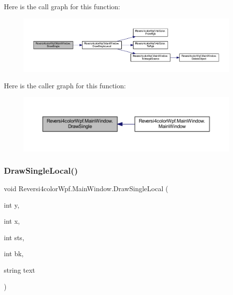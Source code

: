 Here is the call graph for this function\+:
\nopagebreak
\begin{figure}[H]
\begin{center}
\leavevmode
\includegraphics[width=350pt]{class_reversi4color_wpf_1_1_main_window_a423004ac78eb7b105b4cbd4d80a56f15_cgraph}
\end{center}
\end{figure}
Here is the caller graph for this function\+:
\nopagebreak
\begin{figure}[H]
\begin{center}
\leavevmode
\includegraphics[width=350pt]{class_reversi4color_wpf_1_1_main_window_a423004ac78eb7b105b4cbd4d80a56f15_icgraph}
\end{center}
\end{figure}
\mbox{\label{class_reversi4color_wpf_1_1_main_window_a80586da2db47e13ae408b974b3e9f2cc}} 
\subsubsection{\texorpdfstring{Draw\+Single\+Local()}{DrawSingleLocal()}}
{\footnotesize\ttfamily void Reversi4color\+Wpf.\+Main\+Window.\+Draw\+Single\+Local (\begin{DoxyParamCaption}\item[{int}]{y,  }\item[{int}]{x,  }\item[{int}]{sts,  }\item[{int}]{bk,  }\item[{string}]{text }\end{DoxyParamCaption})}



